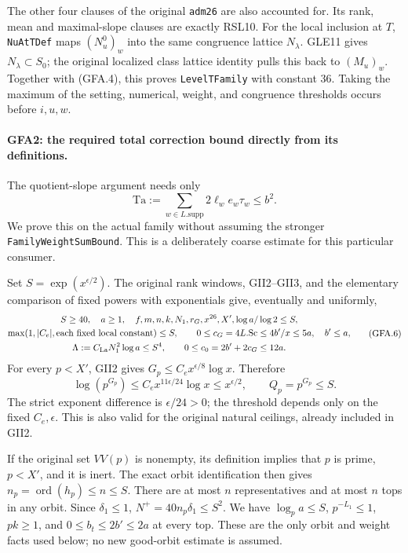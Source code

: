 The other four clauses of the original \texttt{adm26} are also
accounted for.  Its rank, mean and maximal-slope clauses are exactly
RSL10.  For the local inclusion at $T$, \texttt{NuAtTDef} maps
$(N_u^0)_w$ into the same congruence lattice $N_\lambda$.
GLE11 gives $N_\lambda\subset S_0$; the original localized class
lattice identity pulls this back to $(M_u)_w$.  Together with
(GFA.4), this proves \texttt{LevelTFamily} with constant $36$.
Taking the maximum of the setting, numerical, weight, and
congruence thresholds occurs before $i,u,w$.

\paragraph{GFA2: the required total correction bound directly from its definitions.}
\label{claim:GFA2}
The quotient-slope argument needs only
\[
 \mathrm{Ta}:=\sum_{w\in L.\mathrm{supp}}2\ell_we_w\tau_w\le b^2.
                                                               \tag{GFA.5}
\]
We prove this on the actual family without assuming the stronger
\texttt{FamilyWeightSumBound}.  This is a deliberately coarse
estimate for this particular consumer.

Set $S=\exp(x^{\epsilon/2})$.  The original rank windows, GII2--GII3,
and the elementary comparison of fixed powers with exponentials give,
eventually and uniformly,
\[
\begin{gathered}
 S\ge40,\quad a\ge1,\quad
 f,m,n,k,N_1,r_G,x^{26},X',\log a/\log2\le S,\\
 \max(1,|C_e|,\text{each fixed local constant})\le S,
 \qquad 0\le c_G=4L.\mathrm{Sc}\le4b'/x\le5a,\quad b'\le a,\\
 \Lambda:=C_{\rm La}N_1^2\log a\le S^4,
 \qquad 0\le c_0=2b'+2c_G\le12a .
\end{gathered}                                               \tag{GFA.6}
\]
For every $p<X'$, GII2 gives
$G_p\le C_e x^{\epsilon/8}\log x$.  Therefore
\[
 \log(p^{G_p})\le C_e x^{11\epsilon/24}\log x
 \le x^{\epsilon/2},\qquad Q_p=p^{G_p}\le S.                \tag{GFA.7}
\]
The strict exponent difference is $\epsilon/24>0$; the threshold
depends only on the fixed $C_e,\epsilon$.  This is also valid for
the original natural ceilings, already included in GII2.

If the original set $VV(p)$ is nonempty, its definition implies that
$p$ is prime, $p<X'$, and it is inert.  The exact orbit identification
then gives $n_p=\operatorname{ord}(h_p)\le n\le S$.
There are at most $n$ representatives and at most $n$ tops in any
orbit.  Since $\delta_1\le1$,
$N^+=40n_p\delta_1\le S^2$.  We have
$\log_p a\le S$, $p^{-L_1}\le1$, $pk\ge1$, and
$0\le b_t\le2b'\le2a$ at every top.  These are the only
orbit and weight facts used below; no new good-orbit estimate is
assumed.

